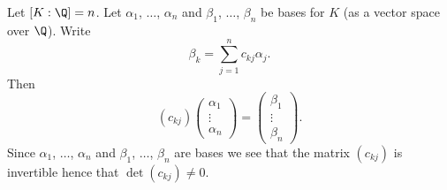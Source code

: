 Let $[K:\Q]=n$.  Let $\alpha_1$, $\dotsc$, $\alpha_n$ and $\beta_1$, $\dotsc$, $\beta_n$ be bases for $K$ (as a vector space over $\Q$).  Write
\[ \beta_k = \sum_{j=1}^n c_{kj}\alpha_j . \]
Then
\[ (c_{kj})\begin{pmatrix}
\alpha_1 \\
\vdots \\
\alpha_n
\end{pmatrix} = \begin{pmatrix}
\beta_1 \\
\vdots \\
\beta_n
\end{pmatrix} . \]
Since $\alpha_1$, $\dotsc$, $\alpha_n$ and $\beta_1$, $\dotsc$, $\beta_n$ are bases we see that the matrix $(c_{kj})$ is invertible hence that $\det(c_{kj})\neq0$.

